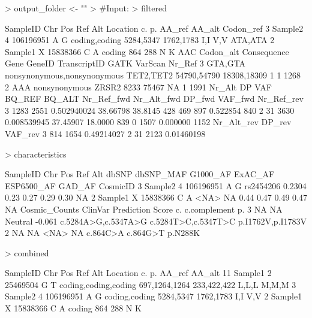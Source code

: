 \documentclass{article}
\begin{document}
\begin{Schunk}
\begin{Sinput}
> output_folder <- ""
> #Input:
> filtered
\end{Sinput}
\begin{Soutput}
  SampleID Chr       Pos Ref Alt      Location        c.        p. AA_ref AA_alt Codon_ref
3  Sample2   4 106196951   A   G coding,coding 5284,5347 1762,1783    I,I    V,V   ATA,ATA
2  Sample1   X  15838366   C   A        coding       864       288      N      K       AAC
  Codon_alt                 Consequence      Gene      GeneID TranscriptID GATK VarScan Nr_Ref
3   GTA,GTA nonsynonymous,nonsynonymous TET2,TET2 54790,54790  18308,18309    1       1   1268
2       AAA               nonsynonymous     ZRSR2        8233        75467   NA       1   1991
  Nr_Alt   DP         VAF   BQ_REF  BQ_ALT Nr_Ref_fwd Nr_Alt_fwd DP_fwd  VAF_fwd Nr_Ref_rev
3   1283 2551 0.502940024 38.66798 38.8145        428        469    897 0.522854        840
2     31 3630 0.008539945 37.45907 18.0000        839          0   1507 0.000000       1152
  Nr_Alt_rev DP_rev    VAF_rev
3        814   1654 0.49214027
2         31   2123 0.01460198
\end{Soutput}
\begin{Sinput}
> characteristics
\end{Sinput}
\begin{Soutput}
  SampleID Chr       Pos Ref Alt     dbSNP dbSNP_MAF G1000_AF ExAC_AF ESP6500_AF GAD_AF CosmicID
3  Sample2   4 106196951   A   G rs2454206    0.2304     0.23    0.27       0.29   0.30       NA
2  Sample1   X  15838366   C   A      <NA>        NA     0.44    0.47       0.49   0.47       NA
  Cosmic_Counts ClinVar Prediction  Score                  c.        c.complement                p.
3            NA      NA    Neutral -0.061 c.5284A>G,c.5347A>G c.5284T>C,c.5347T>C p.I1762V,p.I1783V
2            NA      NA       <NA>     NA            c.864C>A            c.864G>T           p.N288K
\end{Soutput}
\begin{Sinput}
> combined
\end{Sinput}
\begin{Soutput}
   SampleID Chr       Pos Ref Alt             Location            c.          p. AA_ref AA_alt
11  Sample1   2  25469504   G   T coding,coding,coding 697,1264,1264 233,422,422  L,L,L  M,M,M
3   Sample2   4 106196951   A   G        coding,coding     5284,5347   1762,1783    I,I    V,V
2   Sample1   X  15838366   C   A               coding           864         288      N      K

\end{Soutput}
\end{Schunk}
\end{document}
